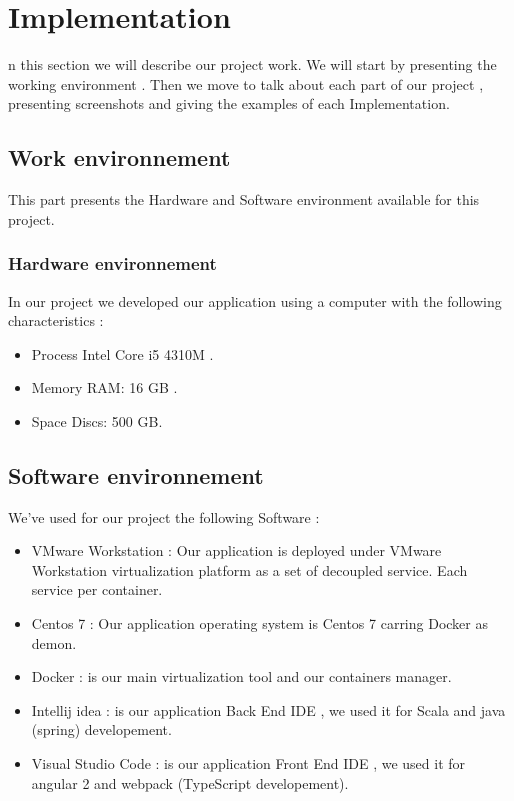 %
%
\let\textcircled=\pgftextcircled
\chapter{Implementation}
\label{chap:intro}

n this section we will describe our project work. 
We will start by presenting the working environment . Then we move to talk about each part of
our project , presenting screenshots and giving the examples of each Implementation.
\section{Work environnement}
\label{sec:sec01}
This part presents the Hardware and Software environment available for this project.
\subsection{Hardware environnement}
\label{sec:sec01}
In our project we developed our application using a computer with the following characteristics : 
\begin{itemize}
  \item Process Intel Core i5 4310M .
  \item Memory RAM: 16 GB .
  \item Space Discs: 500 GB.
\end{itemize}

\section{Software environnement}
\label{sec:sec01}
We've used for our project the following Software :
\begin{itemize}
  \item VMware Workstation : Our application is deployed under VMware Workstation virtualization
   platform as a set of decoupled service. Each service per container.
  \item Centos 7 : Our application operating system is Centos 7 carring Docker as demon. 
  \item Docker : is our main virtualization tool and our containers manager.
  \item Intellij idea : is our application Back End IDE , we used it for Scala and java (spring) developement.
  \item Visual Studio Code : is our application Front End IDE , we used it for angular 2 and webpack (TypeScript developement).
\end{itemize}
